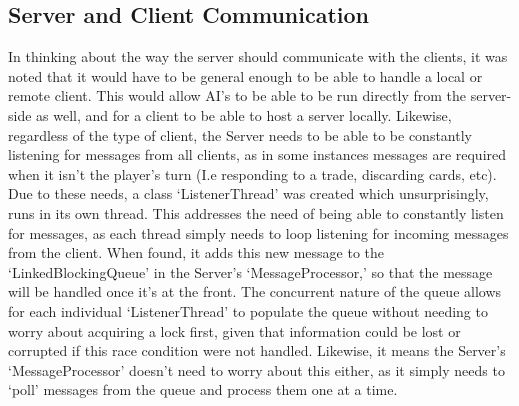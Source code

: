 \documentclass[a4paper,doc,draftfirst]{apa6}
\begin{document}
\subsection{Server and Client Communication}
In thinking about the way the server should communicate with the clients, it was noted that it would have to be general enough to be able to handle a local or remote client. This would allow AI’s to be able to be run directly from the server-side as well, and for a client to be able to host a server locally. Likewise, regardless of the type of client, the Server needs to be able to be constantly listening for messages from all clients, as in some instances messages are required when it isn’t the player’s turn (I.e responding to a trade, discarding cards, etc). Due to these needs, a class ‘ListenerThread’ was created which unsurprisingly, runs in its own thread. This addresses the need of being able to constantly listen for messages, as each thread simply needs to loop listening for incoming messages from the client. When found, it adds this new message to the ‘LinkedBlockingQueue’ in the Server’s ‘MessageProcessor,’ so that the message will be handled once it’s at the front. The concurrent nature of the queue allows for each individual ‘ListenerThread’ to populate the queue without needing to worry about acquiring a lock first, given that information could be lost or corrupted if this race condition were not handled. Likewise, it means the Server’s ‘MessageProcessor’ doesn’t need to worry about this either, as it simply needs to ‘poll’ messages from the queue and process them one at a time.
\end{document}
